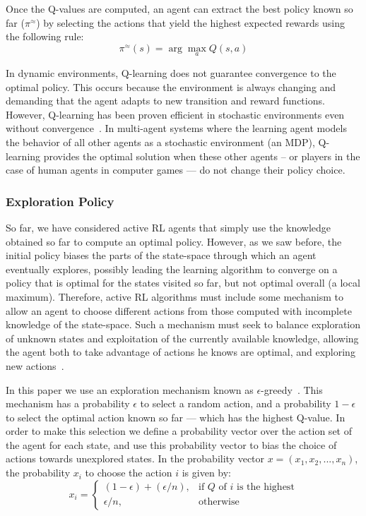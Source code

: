 Once the Q-values are computed, an agent can extract the best policy known so far ($\pi^{\approx}$) by selecting the actions that yield the highest expected rewards using the following rule:
$$\pi^{\approx}(s) = \arg\max_{a}Q(s,a) $$

In dynamic environments, Q-learning does not guarantee convergence to the optimal policy.
This occurs because the environment is always changing and demanding that the agent adapts to new transition and reward functions.
However, Q-learning has been proven efficient in stochastic environments 
even without convergence~\cite{sandholm1996multiagent,tesauro2002pricing,amato2010highlevel}.
In multi-agent systems where the learning agent models the behavior of all other agents as a stochastic environment (an MDP), Q-learning provides the optimal solution when these other agents
-- or players in the case of human agents in computer games --- do not change their policy choice. 



\subsubsection{Exploration Policy}
\label{subsubsec:exploration}

So far, we have considered active RL agents that simply use the knowledge obtained so far to compute an optimal policy. 
However, as we saw before, the initial policy biases the parts of the state-space through which an agent eventually explores, possibly leading the learning algorithm to converge on a policy that is optimal for the states visited so far, but not optimal overall (a local maximum). 
Therefore, active RL algorithms must include some mechanism to allow an agent to choose different actions from those computed with incomplete knowledge of the state-space. 
Such a mechanism must seek to balance exploration of unknown states and exploitation of the currently available knowledge, allowing the agent both to take advantage of actions he knows are optimal, and exploring new actions~\cite{amato2010highlevel}. 

In this paper we use an exploration mechanism known as $\epsilon$-greedy~\cite{rodrigues2009dynamic}. 
This mechanism has a probability $\epsilon$ to select a random action, and a probability $1 - \epsilon$ to select the optimal action known so far --- which has the highest Q-value.
In order to make this selection we define a probability vector over the action set of the agent for each state, and use this probability vector to bias the choice of actions towards unexplored states. 
In the probability vector $x = (x_1, x_2, ..., x_n)$, the probability $x_i$ to choose the action $i$ is given by: 
\[
  x_i = \left\{
  \begin{array}{ll}
    (1 - \epsilon) + (\epsilon / n), & \mbox{if $Q$ of $i$ is the highest} \\
    \epsilon / n, & \mbox{otherwise}
  \end{array}\right.
\]

